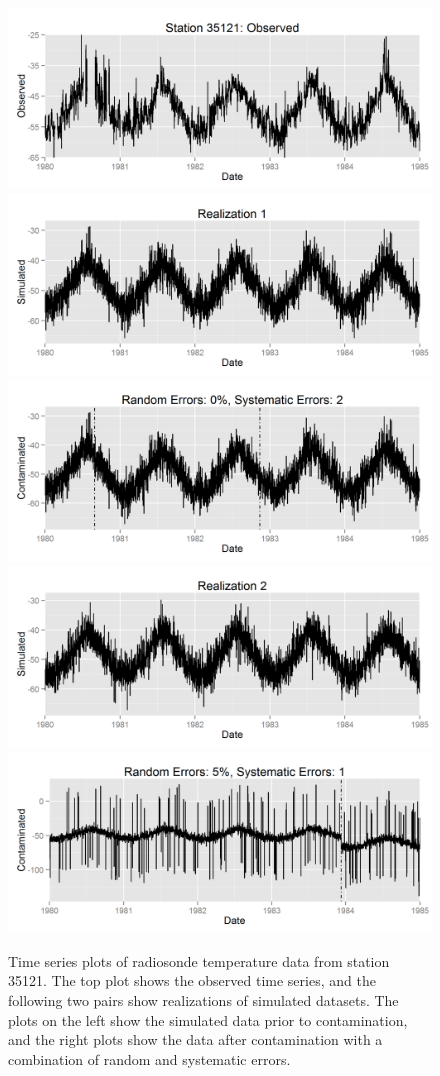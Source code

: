 \documentclass[12pt]{article}
\begin{document}
\begin{figure}
	\centering
	\includegraphics[width=.9\textwidth]{35121_time_series.png}\\
	\includegraphics[width=.45\textwidth]{35121_simulated_1.png}
	\includegraphics[width=.45\textwidth]{35121_contaminated_1.png}\\
	\includegraphics[width=.45\textwidth]{35121_simulated_2.png}
	\includegraphics[width=.45\textwidth]{35121_contaminated_2.png}\\
	\caption{Time series plots of radiosonde temperature data from station 35121.  The top plot shows the observed time series, and the following two pairs show realizations of simulated datasets.  The plots on the left show the simulated data prior to contamination, and the right plots show the data after contamination with a combination of random and systematic errors.}
	\label{fig:simExample}
\end{figure}
\end{document}
